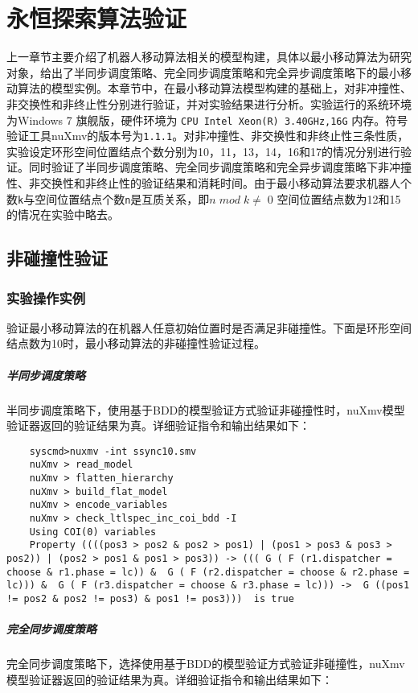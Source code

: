 \chapter{永恒探索算法验证}
上一章节主要介绍了机器人移动算法相关的模型构建，具体以最小移动算法为研究对象，给出了半同步调度策略、完全同步调度策略和完全异步调度策略下的最小移动算法的模型实例。本章节中，在最小移动算法模型构建的基础上，对非冲撞性、非交换性和非终止性分别进行验证，并对实验结果进行分析。实验运行的系统环境为Windows 7 旗舰版，硬件环境为 \verb|CPU Intel Xeon(R) 3.40GHz,16G| 内存。符号验证工具nuXmv的版本号为\verb|1.1.1|。对非冲撞性、非交换性和非终止性三条性质，实验设定环形空间位置结点个数分别为10，11，13，14，16和17的情况分别进行验证。同时验证了半同步调度策略、完全同步调度策略和完全异步调度策略下非冲撞性、非交换性和非终止性的验证结果和消耗时间。由于最小移动算法要求机器人个数\verb|k|与空间位置结点个数\verb|n|是互质关系，即$n \; mod \; k \neq \; 0 $   空间位置结点数为12和15的情况在实验中略去。


\section{非碰撞性验证}
\subsection{实验操作实例}
验证最小移动算法的在机器人任意初始位置时是否满足非碰撞性。下面是环形空间结点数为10时，最小移动算法的非碰撞性验证过程。

\paragraph{半同步调度策略}
半同步调度策略下，使用基于BDD的模型验证方式验证非碰撞性时，nuXmv模型验证器返回的验证结果为真。详细验证指令和输出结果如下：

\begin{lstlisting}
    syscmd>nuxmv -int ssync10.smv
    nuXmv > read_model
    nuXmv > flatten_hierarchy
    nuXmv > build_flat_model
    nuXmv > encode_variables
    nuXmv > check_ltlspec_inc_coi_bdd -I
    Using COI(0) variables
    Property ((((pos3 > pos2 & pos2 > pos1) | (pos1 > pos3 & pos3 > pos2)) | (pos2 > pos1 & pos1 > pos3)) -> ((( G ( F (r1.dispatcher = choose & r1.phase = lc)) &  G ( F (r2.dispatcher = choose & r2.phase = lc))) &  G ( F (r3.dispatcher = choose & r3.phase = lc))) ->  G ((pos1 != pos2 & pos2 != pos3) & pos1 != pos3)))  is true
\end{lstlisting}

\paragraph{完全同步调度策略}
完全同步调度策略下，选择使用基于BDD的模型验证方式验证非碰撞性，nuXmv模型验证器返回的验证结果为真。详细验证指令和输出结果如下：

